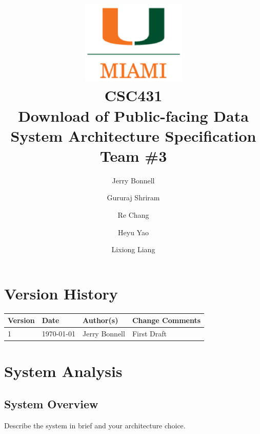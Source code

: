 \documentclass{article}
\begin{document}
\title{
	\includegraphics{images/um_logo.png} \\
	\vspace{0.1in}
	CSC431 \\
	\vspace{0.2in}
	\textbf{Download of Public-facing Data} \\
	\large System Architecture Specification \\
	Team \#3
}

\author{
	Jerry Bonnell
	\and Gururaj Shriram
	\and Re Chang
	\and Heyu Yao
	\and Lixiong Liang
}

\date{}
\maketitle

\clearpage
\section*{Version History}

\begin{tabularx}{\textwidth}{| l | l | X | l |}
	\hline
	\textbf{Version} & \textbf{Date} & \textbf{Author(s)} & \textbf{Change Comments} \\
	\hline
	1 & \today & Jerry Bonnell & First Draft \\
	\hline
\end{tabularx}

\clearpage
\tableofcontents

\clearpage
\listoffigures
\listoftables

\clearpage

\section{System Analysis}

\subsection{System Overview}

Describe the system in brief and your architecture choice.
\end{document}
